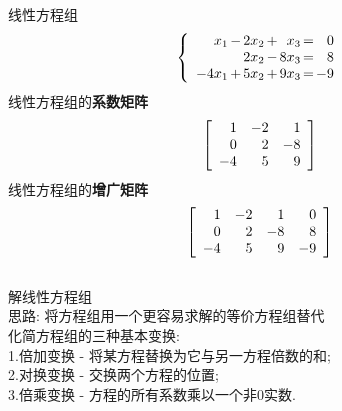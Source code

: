 \documentclass[UTF8,fontset=ubuntu]{ctexart}
\theoremstyle{plain}
\theoremstyle{nonumberplain}
\theoremstyle{empty}
\begin{document}
线性方程组
\[\left\{\begin{array}{r@{\hspace{1.5pt}}l@{\hspace{1.5pt}}r@{\hspace{1.5pt}}l@{\hspace{1.5pt}}r@{\hspace{1.5pt}}l@{\hspace{1.5pt}}r}
x_1 & - & 2x_2 & + &  x_3 & = & 0\\
	& 	& 2x_2 & - & 8x_3 & = & 8\\
-4x_1 & + & 5x_2 & + & 9x_3 & = & -9
\end{array}\right.\]
线性方程组的\textbf{系数矩阵}
\[\left[\begin{array}{r r r}
	1 & -2 & 1\\
	0 & 2  & -8\\
	-4 & 5 & 9
\end{array}\right]\]
线性方程组的\textbf{增广矩阵}
\[\left[\begin{array}{r r r r}
	1 & -2 & 1 & 0\\
	0 & 2  & -8 & 8\\
	-4 & 5 & 9 & -9
\end{array}\right]\]\\[2ex]

解线性方程组\\
思路: 将方程组用一个更容易求解的等价方程组替代\\

化简方程组的三种基本变换:\\
1.倍加变换 - 将某方程替换为它与另一方程倍数的和;\\
2.对换变换 - 交换两个方程的位置;\\
3.倍乘变换 - 方程的所有系数乘以一个非0实数.\\
\end{document}
